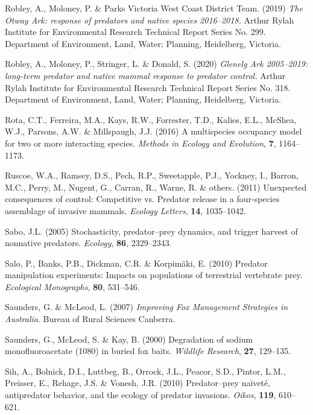 \documentclass[]{elsarticle} %
\begin{document}
\leavevmode\hypertarget{ref-robley2019otway}{}%
Robley, A., Moloney, P. \& Parks Victoria West Coast District Team. (2019) \emph{The Otway Ark: response of predators and native species 2016--2018.} Arthur Rylah Institute for Environmental Research Technical Report Series No. 299. Department of Environment, Land, Water; Planning, Heidelberg, Victoria.

\leavevmode\hypertarget{ref-robley2020glenelg}{}%
Robley, A., Moloney, P., Stringer, L. \& Donald, S. (2020) \emph{Glenelg Ark 2005--2019: long-term predator and native mammal response to predator control.} Arthur Rylah Institute for Environmental Research Technical Report Series No. 318. Department of Environment, Land, Water; Planning, Heidelberg, Victoria.

\leavevmode\hypertarget{ref-rota2016multispecies}{}%
Rota, C.T., Ferreira, M.A., Kays, R.W., Forrester, T.D., Kalies, E.L., McShea, W.J., Parsons, A.W. \& Millspaugh, J.J. (2016) A multispecies occupancy model for two or more interacting species. \emph{Methods in Ecology and Evolution}, \textbf{7}, 1164--1173.

\leavevmode\hypertarget{ref-ruscoe2011unexpected}{}%
Ruscoe, W.A., Ramsey, D.S., Pech, R.P., Sweetapple, P.J., Yockney, I., Barron, M.C., Perry, M., Nugent, G., Carran, R., Warne, R. \& others. (2011) Unexpected consequences of control: Competitive vs. Predator release in a four-species assemblage of invasive mammals. \emph{Ecology Letters}, \textbf{14}, 1035--1042.

\leavevmode\hypertarget{ref-sabo2005stochasticity}{}%
Sabo, J.L. (2005) Stochasticity, predator--prey dynamics, and trigger harvest of nonnative predators. \emph{Ecology}, \textbf{86}, 2329--2343.

\leavevmode\hypertarget{ref-salo2010predator}{}%
Salo, P., Banks, P.B., Dickman, C.R. \& Korpimäki, E. (2010) Predator manipulation experiments: Impacts on populations of terrestrial vertebrate prey. \emph{Ecological Monographs}, \textbf{80}, 531--546.

\leavevmode\hypertarget{ref-saunders2007improving}{}%
Saunders, G. \& McLeod, L. (2007) \emph{Improving Fox Management Strategies in Australia}. Bureau of Rural Sciences Canberra.

\leavevmode\hypertarget{ref-saunders2000degradation}{}%
Saunders, G., McLeod, S. \& Kay, B. (2000) Degradation of sodium monofluoroacetate (1080) in buried fox baits. \emph{Wildlife Research}, \textbf{27}, 129--135.

\leavevmode\hypertarget{ref-sih2010predator}{}%
Sih, A., Bolnick, D.I., Luttbeg, B., Orrock, J.L., Peacor, S.D., Pintor, L.M., Preisser, E., Rehage, J.S. \& Vonesh, J.R. (2010) Predator--prey naïveté, antipredator behavior, and the ecology of predator invasions. \emph{Oikos}, \textbf{119}, 610--621.
\end{document}
